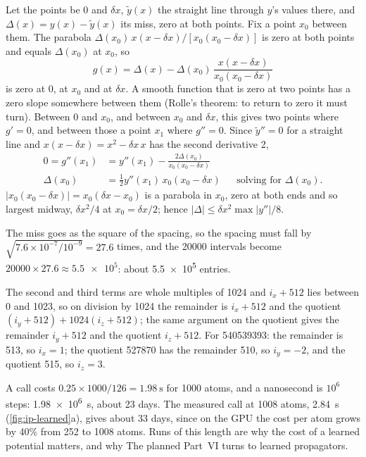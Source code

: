 Let the points be $0$ and $\delta x$, $\tilde
y(x)$ the straight line through $y$'s values there, and $\Delta(x) = y(x)
- \tilde y(x)$ its miss, zero at both points. Fix a point $x_0$ between
them. The parabola $\Delta(x_0)\,x(x - \delta x)/[x_0(x_0 - \delta x)]$
is zero at both points and equals $\Delta(x_0)$ at $x_0$, so
\begin{equation*}
   g(x) = \Delta(x) - \Delta(x_0)\,\frac{x(x - \delta x)}{x_0(x_0 - \delta x)}
\end{equation*}
is zero at $0$, at $x_0$ and at $\delta x$. A smooth function that is
zero at two points has a zero slope somewhere between them (Rolle's
theorem: to return to zero it must turn). Between $0$ and $x_0$, and
between $x_0$ and $\delta x$, this gives two points where $g' = 0$, and
between those a point $x_1$ where $g'' = 0$. Since $\tilde y'' = 0$ for a
straight line and $x(x - \delta x) = x^2 - \delta x\,x$ has the second
derivative 2,
\begin{align*}
   0 = g''(x_1) &= y''(x_1) - \frac{2\Delta(x_0)}{x_0(x_0 - \delta x)}\\
   \Delta(x_0) &= \tfrac12 y''(x_1)\,x_0(x_0 - \delta x)
      && \text{solving for $\Delta(x_0)$.}
\end{align*}
$\lvert x_0(x_0 - \delta x)\rvert = x_0(\delta x - x_0)$ is a parabola in
$x_0$, zero at both ends and so largest midway, $\delta x^2/4$ at $x_0 =
\delta x/2$; hence $\lvert\Delta\rvert \le \delta x^2\max\lvert y''\rvert/8$.

The miss goes as the square of the
spacing, so the spacing must fall by $\sqrt{7.6\times10^{-7}/10^{-9}} =
27.6$ times, and the \num{20000} intervals become $\num{20000}\times27.6
\approx \num{5.5e5}$: about \num{5.5e5} entries.

The second and third terms are whole multiples
of 1024 and $i_x + 512$ lies between 0 and 1023, so on division by 1024
the remainder is $i_x + 512$ and the quotient $(i_y + 512) + 1024(i_z +
512)$; the same argument on the quotient gives the remainder $i_y + 512$
and the quotient $i_z + 512$. For \num{540539393}: the remainder is 513,
so $i_x = 1$; the quotient \num{527870} has the remainder 510, so $i_y =
-2$, and the quotient 515, so $i_z = 3$.

A call costs $0.25\times1000/126 = \SI{1.98}{\second}$
for 1000 atoms, and a nanosecond is $10^6$ steps:
\SI{1.98e6}{\second}, about 23 days. The measured call at 1008 atoms,
\SI{2.84}{\second} (\cref{fig:ip-learned}a), gives about 33 days, since on
the GPU the cost per atom grows by 40\% from 252 to 1008 atoms. Runs of
this length are why the cost of a learned potential matters, and why
The planned Part~VI turns to learned propagators.


